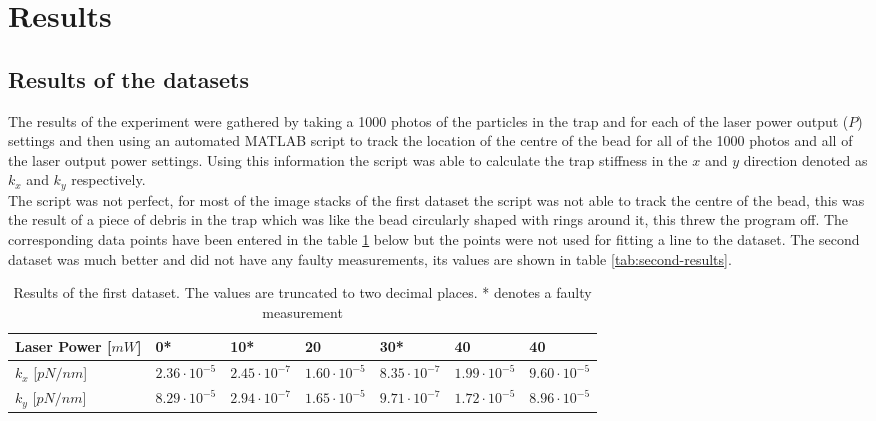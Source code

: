 \section{Results}
\subsection{Results of the datasets}
The results of the experiment were gathered by taking a 1000 photos of the particles in the trap and for each of the laser power output ($P$) settings and then using an automated MATLAB script to track the location of the centre of the bead for all of the 1000 photos and all of the laser output power settings. Using this information the script was able to calculate the trap stiffness in the $x$ and $y$ direction denoted as $k_x$ and $k_y$ respectively.\\
The script was not perfect, for most of the image stacks of the first dataset the script was not able to track the centre of the bead, this was the result of a piece of debris in the trap which was like the bead circularly shaped with rings around it, this threw the program off. The corresponding data points have been entered in the table \ref{tab:first-results} below but the points were not used for fitting a line to the dataset. The second dataset was much better and did not have any faulty measurements, its values are shown in table \ref{tab:second-results}.\\

\vspace{-.2cm}
\begin{table}[h!]
\centering
\begin{tabular}{|l|l|l|l|l|l|l|}
\hline
Laser Power {[}$mW${]} & 0*         & 10*        & 20        & 30*        & 40         & 40        \\ \hline
$k_x$    {[}$pN/nm${]}        & $2.36 \cdot 10^{-5}$ &$ 2.45 \cdot 10^{-7}$ & $1.60\cdot 10^{-5}$  & $8.35\cdot 10^{-7}$ & $1.99\cdot 10^{-5}$  & $9.60\cdot 10^{-5}$ \\ \hline
$k_y$     {[}$pN/nm${]}       & $8.29 \cdot 10^{-5}$ &$ 2.94\cdot 10^{-7}$ & $1.65\cdot 10^{-5}$ & $9.71\cdot 10^{-7}$ & $1.72\cdot 10^{-5}$ & $8.96\cdot 10^{-5}$ \\ \hline
\end{tabular}
\caption{Results of the first dataset. The values are truncated to two decimal places. * denotes a faulty measurement}
\label{tab:first-results}
\end{table}


